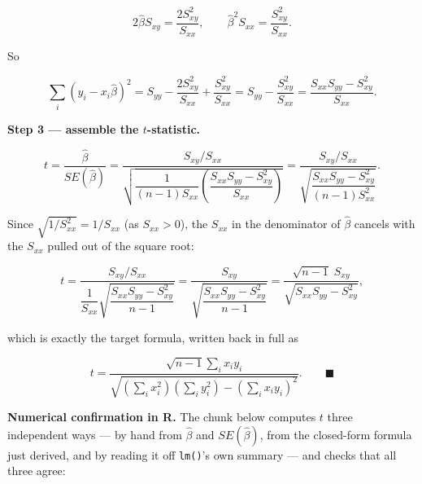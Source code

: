 \documentclass[
  11pt,
]{article}
\begin{document}
\[
2\hat\beta S_{xy} = \frac{2 S_{xy}^2}{S_{xx}}, \qquad
\hat\beta^2 S_{xx} = \frac{S_{xy}^2}{S_{xx}} .
\]

So

\[
\sum_i (y_i - x_i\hat\beta)^2 = S_{yy} - \frac{2S_{xy}^2}{S_{xx}} + \frac{S_{xy}^2}{S_{xx}}
= S_{yy} - \frac{S_{xy}^2}{S_{xx}}
= \frac{S_{xx}S_{yy} - S_{xy}^2}{S_{xx}} .
\]

\textbf{Step 3 --- assemble the \(t\)-statistic.}

\[
t = \frac{\hat\beta}{SE(\hat\beta)}
= \frac{S_{xy}/S_{xx}}{\sqrt{\dfrac{1}{(n-1)S_{xx}}\left(\dfrac{S_{xx}S_{yy}-S_{xy}^2}{S_{xx}}\right)}}
= \frac{S_{xy}/S_{xx}}{\sqrt{\dfrac{S_{xx}S_{yy}-S_{xy}^2}{(n-1)S_{xx}^2}}} .
\]

Since \(\sqrt{1/S_{xx}^2} = 1/S_{xx}\) (as \(S_{xx} > 0\)), the
\(S_{xx}\) in the denominator of \(\hat\beta\) cancels with the
\(S_{xx}\) pulled out of the square root:

\[
t = \frac{S_{xy}/S_{xx}}{\dfrac{1}{S_{xx}}\sqrt{\dfrac{S_{xx}S_{yy}-S_{xy}^2}{n-1}}}
= \frac{S_{xy}}{\sqrt{\dfrac{S_{xx}S_{yy}-S_{xy}^2}{n-1}}}
= \frac{\sqrt{n-1}\; S_{xy}}{\sqrt{S_{xx}S_{yy}-S_{xy}^2}},
\]

which is exactly the target formula, written back in full as

\[
t = \frac{\sqrt{n-1}\sum_i x_iy_i}{\sqrt{\left(\sum_i x_i^2\right)\left(\sum_i y_i^2\right) - \left(\sum_i x_iy_i\right)^2}}. \qquad \blacksquare
\]

\textbf{Numerical confirmation in R.} The chunk below computes \(t\)
three independent ways --- by hand from \(\hat\beta\) and
\(SE(\hat\beta)\), from the closed-form formula just derived, and by
reading it off \texttt{lm()}'s own summary --- and checks that all three
agree:
\end{document}
